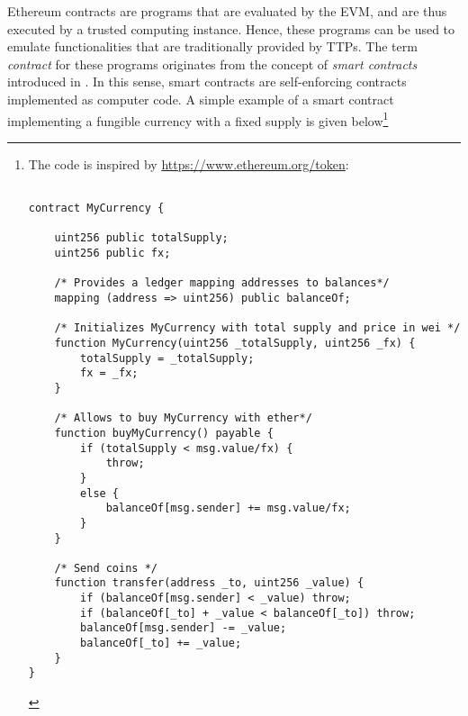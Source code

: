 Ethereum contracts are programs that are evaluated by the \ac{EVM}, and are thus executed by a trusted computing instance. Hence, these programs can be used to emulate functionalities that are traditionally provided by \ac{TTP}s. The term \emph{contract} for these programs originates from the concept of \emph{smart contracts} introduced in \parencite{szabo1997}. In this sense, smart contracts are self-enforcing contracts implemented as computer code. A simple example of a smart contract implementing a fungible currency with a fixed supply is given below\footnote{The code is inspired by \url{https://www.ethereum.org/token}:

\begin{verbatim}
 
contract MyCurrency {
  
    uint256 public totalSupply;
    uint256 public fx;

    /* Provides a ledger mapping addresses to balances*/
    mapping (address => uint256) public balanceOf;
  
    /* Initializes MyCurrency with total supply and price in wei */
    function MyCurrency(uint256 _totalSupply, uint256 _fx) {
        totalSupply = _totalSupply; 
        fx = _fx;
    }
    
    /* Allows to buy MyCurrency with ether*/
    function buyMyCurrency() payable {
        if (totalSupply < msg.value/fx) {
            throw;
        }
        else {
            balanceOf[msg.sender] += msg.value/fx;     
        }       
    }

    /* Send coins */
    function transfer(address _to, uint256 _value) {
        if (balanceOf[msg.sender] < _value) throw;           
        if (balanceOf[_to] + _value < balanceOf[_to]) throw;
        balanceOf[msg.sender] -= _value;   
        balanceOf[_to] += _value;                            
    }
}
\end{verbatim}

}
